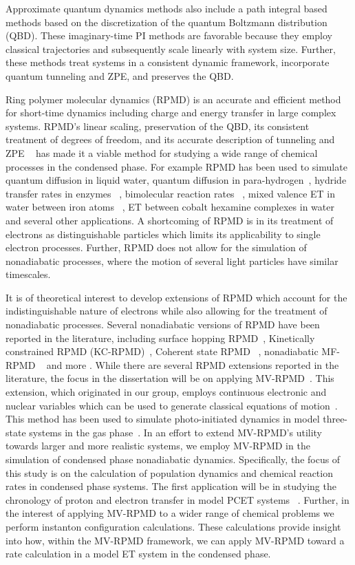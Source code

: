 \documentclass[phd,tocprelim]{cornell}
\begin{document}
Approximate quantum dynamics methods also include a path integral based methods based on the discretization of the quantum Boltzmann distribution (QBD). These imaginary-time PI methods are favorable because they employ classical trajectories and subsequently scale linearly with system size. Further, these methods treat systems in a consistent dynamic framework, incorporate quantum tunneling and ZPE, and preserves the QBD.


Ring polymer molecular dynamics (RPMD) is an accurate and efficient method for short-time dynamics including charge and energy transfer in large complex systems. RPMD's linear scaling, preservation of the QBD, its consistent treatment of degrees of freedom, and its accurate description of tunneling and ZPE ~\cite{hab13} has made it a viable method for studying a wide range of chemical processes in the condensed phase. For example RPMD has been used to simulate quantum diffusion in liquid water,  quantum diffusion in para-hydrogen~\cite{TFM2005}, hydride transfer rates in enzymes ~\cite{TFM2011}, bimolecular reaction rates ~\cite{MANO2011,MANO2009}, mixed valence ET in water between iron atoms ~\cite{ARM2011}, ET between cobalt hexamine complexes in water ~\cite{RK2016} and several other applications. A shortcoming of RPMD is in its treatment of electrons as distinguishable particles which limits its applicability to single electron processes. Further, RPMD does not allow for the simulation of nonadiabatic processes, where the motion of several light particles have similar timescales. 



It is of theoretical interest to develop extensions of RPMD which account for the indistinguishable nature of electrons while also allowing for the treatment of nonadiabatic processes. Several nonadiabatic versions of RPMD have been reported in the literature, including surface hopping RPMD~\cite{HUO2017-2}, Kinetically constrained RPMD (KC-RPMD)~\cite{TFM2014}, Coherent state RPMD ~\cite{HUO2017}, nonadiabatic MF-RPMD ~\cite{JD2016} and more \cite{shu12a,NA2013,ric13a,NA2015}. While there are several RPMD extensions reported in the literature, the focus in the dissertation will be on applying MV-RPMD~\cite{NA2015, NA2013}. This extension, which originated in our group, employs continuous electronic and nuclear variables which can be used to generate classical equations of motion~\cite{ NA2013}. This method has been used to simulate photo-initiated dynamics in model three-state systems in the gas phase~\cite{NA2015}. In an effort to extend MV-RPMD's utility towards larger and more realistic systems, we employ MV-RPMD in the simulation of condensed phase nonadiabatic dynamics. Specifically, the focus of this study is on the calculation of population dynamics and chemical reaction rates in condensed phase systems. The first application will be in studying the chronology of proton and electron transfer in model PCET systems ~\cite{SP2017}. Further, in the interest of applying MV-RPMD to a wider range of chemical problems we perform instanton configuration calculations. These calculations provide insight into how, within the MV-RPMD framework, we can apply MV-RPMD toward a rate calculation in a model ET system in the condensed phase. 
\end{document}
